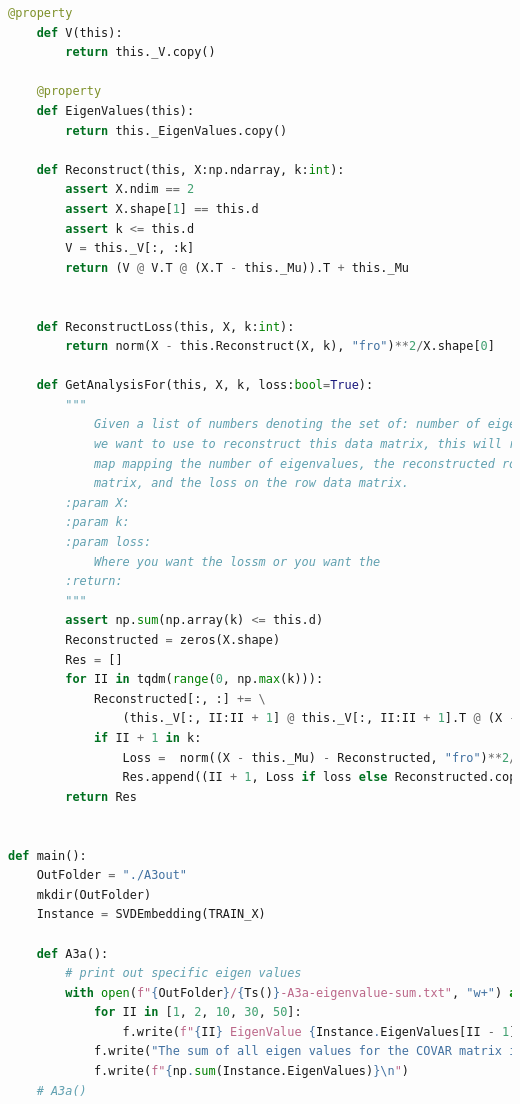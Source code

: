 \documentclass[]{article}
\begin{document}
\begin{lstlisting}[language=python]
    @property
    def V(this):
        return this._V.copy()

    @property
    def EigenValues(this):
        return this._EigenValues.copy()

    def Reconstruct(this, X:np.ndarray, k:int):
        assert X.ndim == 2
        assert X.shape[1] == this.d
        assert k <= this.d
        V = this._V[:, :k]
        return (V @ V.T @ (X.T - this._Mu)).T + this._Mu


    def ReconstructLoss(this, X, k:int):
        return norm(X - this.Reconstruct(X, k), "fro")**2/X.shape[0]

    def GetAnalysisFor(this, X, k, loss:bool=True):
        """
            Given a list of numbers denoting the set of: number of eigenvalues
            we want to use to reconstruct this data matrix, this will return a
            map mapping the number of eigenvalues, the reconstructed row data
            matrix, and the loss on the row data matrix.
        :param X:
        :param k:
        :param loss:
            Where you want the lossm or you want the
        :return:
        """
        assert np.sum(np.array(k) <= this.d)
        Reconstructed = zeros(X.shape)
        Res = []
        for II in tqdm(range(0, np.max(k))):
            Reconstructed[:, :] += \
                (this._V[:, II:II + 1] @ this._V[:, II:II + 1].T @ (X - this._Mu).T).T
            if II + 1 in k:
                Loss =  norm((X - this._Mu) - Reconstructed, "fro")**2/X.shape[0]
                Res.append((II + 1, Loss if loss else Reconstructed.copy()))
        return Res


def main():
    OutFolder = "./A3out"
    mkdir(OutFolder)
    Instance = SVDEmbedding(TRAIN_X)

    def A3a():
        # print out specific eigen values
        with open(f"{OutFolder}/{Ts()}-A3a-eigenvalue-sum.txt", "w+") as f:
            for II in [1, 2, 10, 30, 50]:
                f.write(f"{II} EigenValue {Instance.EigenValues[II - 1]}\n")
            f.write("The sum of all eigen values for the COVAR matrix is:\n")
            f.write(f"{np.sum(Instance.EigenValues)}\n")
    # A3a()


\end{lstlisting}
\end{document}

